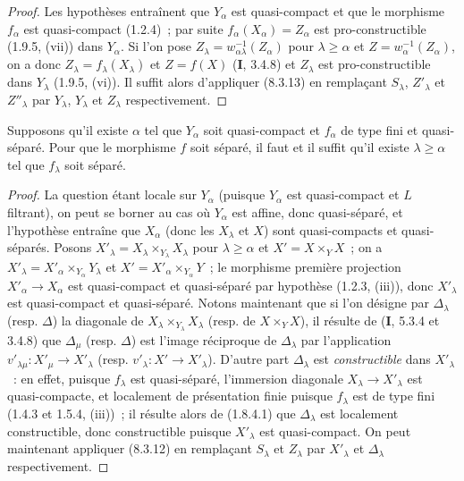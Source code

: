 \begin{proof}
Les hypothèses entraînent que $Y_\alpha$ est quasi-compact et que le morphisme
$f_\alpha$ est quasi-compact (1.2.4)~; par suite
$f_\alpha(X_\alpha)=Z_\alpha$ est pro-constructible (1.9.5,
(vii)) dans $Y_\alpha$. Si l'on pose
$Z_\lambda=w_{\alpha\lambda}^{-1}(Z_\alpha)$ pour $\lambda\geq\alpha$ et
$Z=w_\alpha^{-1}(Z_\alpha)$, on a donc
$Z_\lambda=f_\lambda(X_\lambda)$ et
$Z=f(X)$ (\textbf{I}, 3.4.8) et $Z_\lambda$ est pro-constructible dans
$Y_\lambda$ (1.9.5, (vi)). Il suffit alors d'appliquer (8.3.13) en
remplaçant $S_\lambda$, $Z'_\lambda$ et $Z''_\lambda$ par $Y_\lambda$,
$Y_\lambda$ et $Z_\lambda$ respectivement.
\end{proof}

\begin{proposition}[8.10.4]
\label{IV.8.10.4-fr}
Supposons qu'il existe $\alpha$ tel que $Y_\alpha$ soit quasi-compact et
$f_\alpha$ de type fini et quasi-séparé. Pour que le morphisme $f$ soit
séparé, il faut et il suffit qu'il existe $\lambda\geq\alpha$ tel que
$f_\lambda$ soit séparé.
\end{proposition}

\begin{proof}
La question étant locale sur $Y_\alpha$ (puisque $Y_\alpha$ est quasi-compact
et $L$ filtrant), on peut se borner au cas où $Y_\alpha$ est affine, donc
quasi-séparé, et l'hypothèse entraîne que $X_\alpha$ (donc les $X_\lambda$ et
$X$) sont quasi-compacts et quasi-séparés. Posons
$X'_\lambda=X_\lambda\times_{Y_\lambda}X_\lambda$ pour
$\lambda\geq\alpha$ et $X'=X\times_YX$~; on a
$X'_\lambda=X'_\alpha\times_{Y_\alpha}Y_\lambda$ et
$X'=X'_\alpha\times_{Y_\alpha}Y$~; le morphisme première projection
$X'_\alpha\to X_\alpha$ est quasi-compact et quasi-séparé par hypothèse
(1.2.3, (iii)), donc $X'_\lambda$ est quasi-compact et quasi-séparé.
Notons maintenant que si l'on désigne par $\Delta_\lambda$ (resp. $\Delta$)
la diagonale de $X_\lambda\times_{Y_\lambda}X_\lambda$ (resp. de
$X\times_YX$), il résulte de (\textbf{I}, 5.3.4 et 3.4.8) que $\Delta_\mu$ (resp.
$\Delta$) est l'image réciproque de $\Delta_\lambda$ par l'application
$v'_{\lambda\mu}:X'_\mu\to X'_\lambda$ (resp.
$v'_\lambda:X'\to X'_\lambda$). D'autre part $\Delta_\lambda$ est
\emph{constructible} dans $X'_\lambda$~: en effet, puisque $f_\lambda$ est
quasi-séparé, l'immersion diagonale $X_\lambda\to X'_\lambda$ est
quasi-compacte, et localement de présentation finie puisque $f_\lambda$ est
de type fini (1.4.3 et 1.5.4, (iii))~; il résulte alors de (1.8.4.1) que
$\Delta_\lambda$ est localement constructible, donc constructible puisque
$X'_\lambda$ est quasi-compact. On peut maintenant appliquer (8.3.12) en
remplaçant $S_\lambda$ et $Z_\lambda$ par $X'_\lambda$ et $\Delta_\lambda$
respectivement.
\end{proof}

